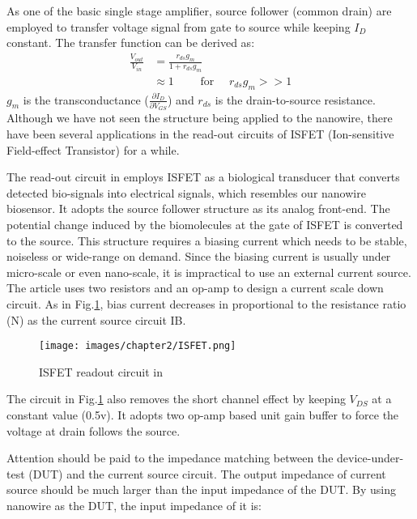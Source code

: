 As one of the basic single stage amplifier, source follower (common drain) are employed to transfer voltage signal from gate to source while keeping $I_D$ constant.
The transfer function can be derived as:
\setlength{\mathindent}{5.5cm}
\begin{align}
    \frac{V_{out}}{V_{in}} & = \frac{r_{ds}g_m}{1 + r_{ds}g_m} \\    \label{eq:sfTF}
                           & \approx 1 \qquad \text{ for } \quad r_{ds}g_m >> 1
\end{align}
$g_m$ is the transconductance ($\frac{\partial I_D}{\partial V_{GS}}$) and $r_{ds}$ is the drain-to-source resistance.
Although we have not seen the structure being applied to the nanowire, there have been several applications in the read-out circuits of ISFET (Ion-sensitive Field-effect Transistor)\cite{SF1, SF2} for a while.

The read-out circuit in \cite{SF1} employs ISFET as a biological transducer that converts detected bio-signals into electrical signals, which resembles our nanowire biosensor.
It adopts the source follower structure as its analog front-end.
The potential change induced by the biomolecules at the gate of ISFET is converted to the source.
This structure requires a biasing current which needs to be stable, noiseless or wide-range on demand.
Since the biasing current is usually under micro-scale or even nano-scale, it is impractical to use an external current source.
The article \cite{SF1} uses two resistors and an op-amp to design a current scale down circuit.
As in Fig.\ref{fig:ISFET}, bias current decreases in proportional to the resistance ratio (N) as the current source circuit I{\scriptsize B}.

\begin{figure}[h]
    \centering
    \texttt{[image: images/chapter2/ISFET.png]}
    \fontsize{6}{7}\selectfont
    \caption{ISFET readout circuit in \cite{SF1}}
    \label{fig:ISFET}
\end{figure}
The circuit in Fig.\ref{fig:ISFET} also removes the short channel effect by keeping $V_{DS}$ at a constant value (0.5v).
It adopts two op-amp based unit gain buffer to force the voltage at drain follows the source.

Attention should be paid to the impedance matching between the device-under-test (DUT) and the current source circuit.
The output impedance of current source should be much larger than the input impedance of the DUT.
By using nanowire as the DUT, the input impedance of it is:

